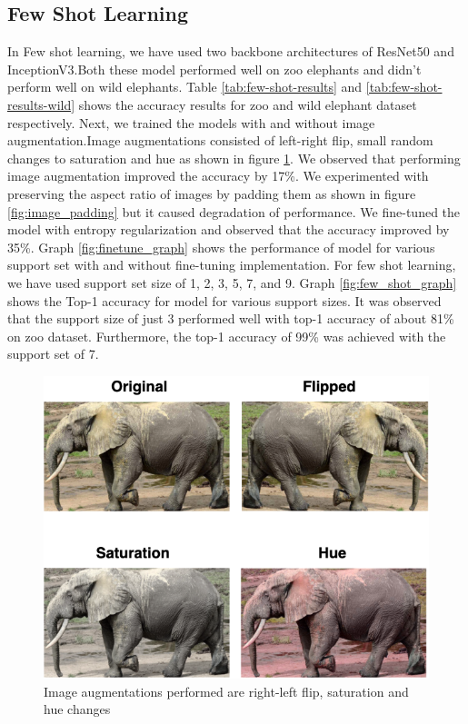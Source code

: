 \documentclass[10pt,twocolumn,letterpaper]{article}
\begin{document}
\subsection{Few Shot Learning}

In Few shot learning, we have used two backbone architectures of ResNet50 and InceptionV3.Both these model performed well on zoo elephants and didn't perform well on wild elephants. Table \ref{tab:few-shot-results} and \ref{tab:few-shot-results-wild} shows the accuracy results for zoo and wild elephant dataset respectively. Next, we trained the models with and without image augmentation.Image augmentations consisted of left-right flip, small random changes to saturation and hue as shown in figure \ref{fig:augmentation}. We observed that performing image augmentation improved the accuracy by 17\%. We experimented with preserving the aspect ratio of images by padding them as shown in figure \ref{fig:image_padding} but it caused degradation of performance. We fine-tuned the model with entropy regularization and observed that the accuracy improved by 35\%. Graph \ref{fig:finetune_graph} shows the performance of model for various support set with and without fine-tuning implementation. For few shot learning, we have used support set size of 1, 2, 3, 5, 7, and 9. Graph \ref{fig:few_shot_graph} shows the Top-1 accuracy for model for various support sizes. It was observed that the support size of just 3 performed well with top-1 accuracy of about 81\% on zoo dataset. Furthermore, the top-1 accuracy of 99\% was achieved with the support set of 7. 


\begin{figure}[t]
  \centering
  \includegraphics[scale=0.37]{augmentation}
   \caption{Image augmentations performed are right-left flip, saturation and hue changes}
   \label{fig:augmentation}
\end{figure}
\end{document}
